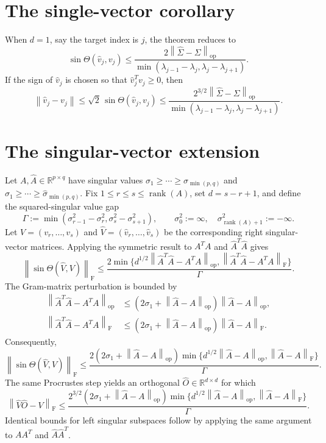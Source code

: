 \documentclass[11pt]{article}
\newcommand{\ErrMat}{\widehat{\Sigma}-\Sigma}
\newcommand{\ErrMat}{\widetilde A-A}
\newcommand{\R}{\mathbb R}
\newcommand{\sgap}{\Gamma}
\newcommand{\norm}[1]{\left\lVert #1 \right\rVert}
\newcommand{\op}{\mathrm{op}}
\newcommand{\F}{\mathrm F}
\newcommand{\rank}{\operatorname{rank}}
\theoremstyle{remark}
\begin{document}
\section{The single-vector corollary}

When $d=1$, say the target index is $j$, the theorem reduces to
\[
  \sin\Theta(\widehat v_j,v_j)
  \leq
  \frac{2\norm{\ErrMat}_{\op}}
       {\min(\lambda_{j-1}-\lambda_j,\lambda_j-\lambda_{j+1})}.
\]
If the sign of $\widehat v_j$ is chosen so that $\widehat v_j^Tv_j\geq 0$,
then
\[
  \norm{\widehat v_j-v_j}
  \leq \sqrt2\,\sin\Theta(\widehat v_j,v_j)
  \leq
  \frac{2^{3/2}\norm{\ErrMat}_{\op}}
       {\min(\lambda_{j-1}-\lambda_j,\lambda_j-\lambda_{j+1})}.
\]

\section{The singular-vector extension}

Let $A,\widehat A\in\R^{p\times q}$ have singular values
$\sigma_1\geq\cdots\geq\sigma_{\min(p,q)}$ and
$\widehat\sigma_1\geq\cdots\geq\widehat\sigma_{\min(p,q)}$.  Fix
$1\leq r\leq s\leq\rank(A)$, set $d=s-r+1$, and define the squared-singular
value gap
\[
  \sgap := \min(\sigma_{r-1}^2-\sigma_r^2,
                 \sigma_s^2-\sigma_{s+1}^2),
  \qquad
  \sigma_0^2:=\infty,
  \quad
  \sigma_{\rank(A)+1}^2:=-\infty.
\]
Let $V=(v_r,\ldots,v_s)$ and $\widehat V=(\widehat v_r,\ldots,\widehat v_s)$
be the corresponding right singular-vector matrices.  Applying the symmetric
result to $A^TA$ and $\widehat A^T\widehat A$ gives
\[
  \norm{\sin\Theta(\widehat V,V)}_{\F}
  \leq
  \frac{2\min\{d^{1/2}\norm{\widehat A^T\widehat A-A^TA}_{\op},
               \norm{\widehat A^T\widehat A-A^TA}_{\F}\}}{\sgap}.
\]
The Gram-matrix perturbation is bounded by
\[
\begin{aligned}
  \norm{\widehat A^T\widehat A-A^TA}_{\op}
  &\leq (2\sigma_1+\norm{\widehat A-A}_{\op})\norm{\widehat A-A}_{\op},\\
  \norm{\widehat A^T\widehat A-A^TA}_{\F}
  &\leq (2\sigma_1+\norm{\widehat A-A}_{\op})\norm{\widehat A-A}_{\F}.
\end{aligned}
\]
Consequently,
\[
  \norm{\sin\Theta(\widehat V,V)}_{\F}
  \leq
  \frac{2(2\sigma_1+\norm{\widehat A-A}_{\op})
        \min\{d^{1/2}\norm{\widehat A-A}_{\op},
              \norm{\widehat A-A}_{\F}\}}{\sgap}.
\]
The same Procrustes step yields an orthogonal $\widehat O\in\R^{d\times d}$
for which
\[
  \norm{\widehat V\widehat O-V}_{\F}
  \leq
  \frac{2^{3/2}(2\sigma_1+\norm{\widehat A-A}_{\op})
        \min\{d^{1/2}\norm{\widehat A-A}_{\op},
              \norm{\widehat A-A}_{\F}\}}{\sgap}.
\]
Identical bounds for left singular subspaces follow by applying the same
argument to $AA^T$ and $\widehat A\widehat A^T$.
\end{document}

